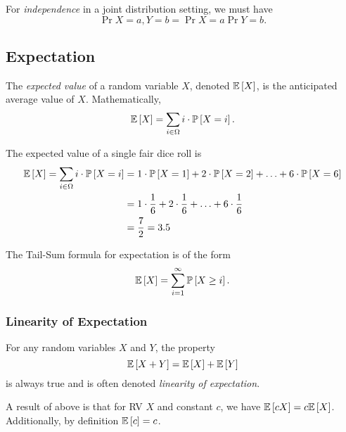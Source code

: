 \begin{definition}[Independence]
    For \textit{independence} in a joint distribution setting, we must have \[ \Pr{X = a, Y = b} = \Pr{X = a} \Pr{Y = b}. \]
\end{definition}

\subsection{Expectation}
\begin{definition}
    The \textit{expected value} of a random variable $X$, denoted $\mathbb{E}\left[ X \right]$, is the anticipated average value of $X$. Mathematically, \[ \mathbb{E}\left[ X \right] = \sum_{i \in \Omega} i \cdot \mathbb{P}\left[ X = i \right]. \]
\end{definition}

\begin{example}
    The expected value of a single fair dice roll is \begin{align*} \mathbb{E}\left[ X \right] = \sum_{i \in \Omega} i \cdot \mathbb{P}\left[ X = i \right] &= 1 \cdot \mathbb{P}\left[ X = 1 \right] + 2 \cdot \mathbb{P}\left[ X = 2 \right] + \ldots + 6 \cdot \mathbb{P}\left[ X = 6 \right] \\
    &= 1 \cdot \frac{1}{6} + 2 \cdot \frac{1}{6} + \ldots + 6 \cdot \frac{1}{6} \\
    &= \frac{7}{2} = 3.5
    \end{align*} 
\end{example}

\begin{theorem}
    The Tail-Sum formula for expectation is of the form \[ \mathbb{E}\left[ X \right] = \sum_{i=1}^{\infty} \mathbb{P}\left[ X \ge i \right]. \]
\end{theorem}

\subsubsection{Linearity of Expectation}
For any random variables $X$ and $Y$, the property \[ \mathbb{E}\left[ X+Y \right] = \mathbb{E}\left[ X \right] + \mathbb{E}\left[ Y \right] \] is always true and is often denoted \textit{linearity of expectation}. 

A result of above is that for RV $X$ and constant $c$, we have $\mathbb{E}\left[ cX \right] = c\mathbb{E}\left[ X \right]$. Additionally, by definition $\mathbb{E}\left[ c \right] = c$. 